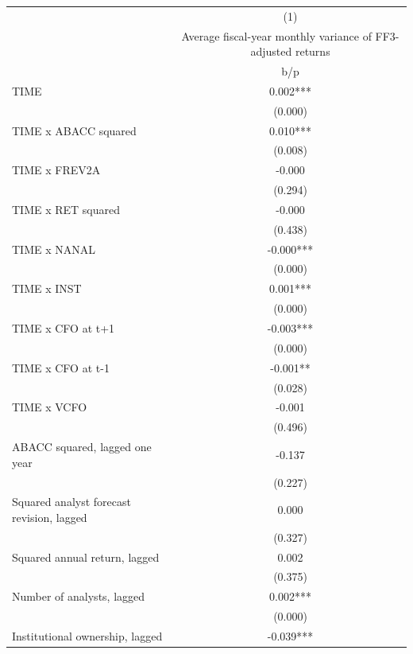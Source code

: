 {
\def\sym#1{\ifmmode^{#1}\else\(^{#1}\)\fi}
\begin{tabular}{l*{1}{c}}
\hline\hline
                    &\multicolumn{1}{c}{(1)}\\
                    &\multicolumn{1}{c}{Average fiscal-year monthly variance of FF3-adjusted returns}\\
                    &         b/p   \\
\hline
TIME                &       0.002***\\
                    &     (0.000)   \\
TIME x ABACC squared&       0.010***\\
                    &     (0.008)   \\
TIME x FREV2A       &      -0.000   \\
                    &     (0.294)   \\
TIME x RET squared  &      -0.000   \\
                    &     (0.438)   \\
TIME x NANAL        &      -0.000***\\
                    &     (0.000)   \\
TIME x INST         &       0.001***\\
                    &     (0.000)   \\
TIME x CFO at t+1   &      -0.003***\\
                    &     (0.000)   \\
TIME x CFO at t-1   &      -0.001** \\
                    &     (0.028)   \\
TIME x VCFO         &      -0.001   \\
                    &     (0.496)   \\
ABACC squared, lagged one year&      -0.137   \\
                    &     (0.227)   \\
Squared analyst forecast revision, lagged&       0.000   \\
                    &     (0.327)   \\
Squared annual return, lagged&       0.002   \\
                    &     (0.375)   \\
Number of analysts, lagged&       0.002***\\
                    &     (0.000)   \\
Institutional ownership, lagged&      -0.039***\\

\end{tabular}}
